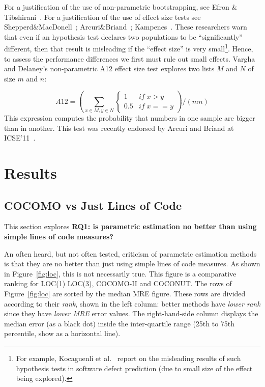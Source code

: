\documentclass{sig-alternate}
\newcommand{\fig}[1]{Figure~\ref{fig:#1}}
\begin{document}
For a justification of the use of non-parametric
bootstrapping, see Efron \&
Tibshirani~\cite[p220-223]{efron93}.
For a justification of the use of effect size tests
see Shepperd\&MacDonell~\cite{shepperd12a}; Arcuri\&Briand~\cite{arcuri11}; Kampenes~\cite{kampenes07}. These researchers
warn that even if an
hypothesis test declares two populations to be
``significantly'' different, then that result is
misleading if the ``effect size'' is very small\footnote{For
example, Kocaguenli et al.~\cite{kocharm13} report on the misleading
results of such hypothesis tests in software defect
prediction (due to small size of the effect being
explored).}.
Hence, to assess 
the performance differences 
we first must rule out small effects.
Vargha and Delaney's
non-parametric 
A12 effect size test 
explores
two lists $M$ and $N$ of size $m$ and $n$:

{\footnotesize \[A12 = \left(\sum_{x\in M, y \in N} 
\begin{cases} 
1   & \mathit{if}\; x > y\\
0.5 & \mathit{if}\; x == y
\end{cases}\right) / (mn)
\]}
This expression computes the probability that numbers in one sample are bigger than in another.
This test was recently 
endorsed by Arcuri and Briand
at ICSE'11~\cite{arcuri11}.

\section{Results}
\subsection{COCOMO vs Just Lines of Code}\label{sect:justloc}
This section explores {\bf RQ1:
is parametric estimation no better than 
using simple lines of code measures?}

An often heard, but not often tested, criticism of parametric
estimation methods is that they are no
better than just using simple lines of code measures.
As shown in \fig{loc}, this is not necessarily true.
This figure is a comparative ranking for LOC(1)
LOC(3), COCOMO-II and COCONUT.
The rows of \fig{loc} are sorted by the median MRE figure.
These rows are divided according to their 
 {\em rank}, shown in the left column: better methods
have {\em lower rank} since they have {\em lower MRE} error values.
The right-hand-side column displays the median error (as a black dot)
inside the inter-quartile range
(25th to 75th percentile, show as a horizontal line).
\end{document}
